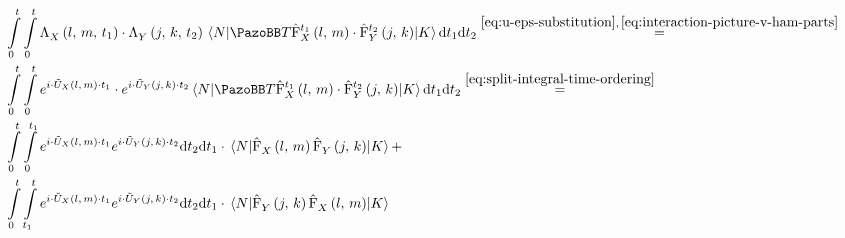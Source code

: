 \begin{equation}
    \label{eq:time-ordered-integral}
    \begin{split}
        &\int\limits_0^t \int\limits_0^t  
        \VhamiltonianAnalyticalPart{$X$}{l}{m}{t_1}
        \cdot 
        \VhamiltonianAnalyticalPart{$Y$}{j}{k}{t_2}
        \bracketHelper{N}{\timeOrderingOperator
            \VhamiltonianOperatorPart[t_1]{$X$}{l}{m}
        \cdot 
            \VhamiltonianOperatorPart[t_2]{$Y$}{j}{k}
        }{K}            \mathrm{d}t_1\mathrm{d}t_2
        \stackrel{\ref{eq:u-eps-substitution},\,\ref{eq:interaction-picture-v-ham-parts}}{=}\\
        &\int\limits_0^t \int\limits_0^t  
        e^{
            i \cdot \ueps{$X$}{l}{m} \cdot t_1
        }
        \cdot 
        e^{
            i \cdot \ueps{$Y$}{j}{k} \cdot t_2
        }
        \bracketHelper{N}{\timeOrderingOperator
            \VhamiltonianOperatorPart[t_1]{$X$}{l}{m}
        \cdot 
            \VhamiltonianOperatorPart[t_2]{$Y$}{j}{k}
        }{K}            \mathrm{d}t_1\mathrm{d}t_2 \stackrel{\ref{eq:split-integral-time-ordering}}{=} \\
        &\int\limits_0^t  \int\limits_0^{t_1}
        e^{
            i \cdot \ueps{$X$}{l}{m} \cdot t_1
        }
        e^{
            i \cdot \ueps{$Y$}{j}{k} \cdot t_2
        }
        \mathrm{d}t_2
        \mathrm{d}t_1
        \cdot 
        \bracketHelper{N}{
            \VhamiltonianOperatorPart[]{$X$}{l}{m}
            \VhamiltonianOperatorPart[]{$Y$}{j}{k}
        }{K}            + \\
        &\int\limits_0^t  \int\limits_{t_1}^t
        e^{
            i \cdot \ueps{$X$}{l}{m} \cdot t_1
        }
        e^{
            i \cdot \ueps{$Y$}{j}{k} \cdot t_2
        }
        \mathrm{d}t_2
        \mathrm{d}t_1
        \cdot 
        \bracketHelper{N}{
            \VhamiltonianOperatorPart[]{$Y$}{j}{k}
            \VhamiltonianOperatorPart[]{$X$}{l}{m}
        }{K} 
    \end{split}
\end{equation}
